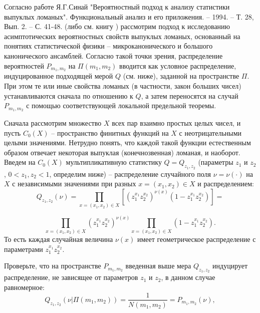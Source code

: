 \begin{ordre} 

Согласно работе Я.Г.Синай "Вероятностный подход к анализу статистики выпуклых ломаных". Функциональный анализ и его приложения. -- 1994. -- Т. 28, Вып. 2. -- С. 41-48. (либо см. книгу \cite{7}) рассмотрим подход к исследованию асимптотических вероятностных свойств выпуклых ломаных, основанный на понятиях статистической физики -- микроканонического и большого канонического ансамблей. Согласно такой точки зрения, распределение вероятностей $P_{m_{1} ,m_{2}}$ на $\Pi(m_{1} ,m_{2})$ вводится как условное распределение, индуцированное подходящей мерой $Q$ (см. ниже), заданной на
пространстве $\Pi$. При этом те или иные свойства ломаных (в частности, закон
больших чисел) устанавливаются сначала по отношению к $Q$, а затем переносятся
на случай $P_{m_{1} ,m_{2}}$  с помощью соответствующей локальной предельной теоремы.

Сначала рассмотрим множество $X$ всех пар взаимно простых целых чисел, и пусть $C_{0} (X)$ -- пространство финитных функций на $X$  с неотрицательными целыми значениями. Нетрудно понять, что каждой такой функции естественным образом отвечает некоторая выпуклая (конечнозвенная) ломаная, и наоборот. Введем на $C_{0} (X)$ мультипликативную статистику $Q = Q_{z_1,z_2}$ (параметры $z_1$ и $z_2$, $0<z_1,z_2<1$, определим ниже) -- распределение случайного поля $\nu = \nu(\cdot)$  на $X$ с независимыми значениями при разных $x = (x_1, x_2)\in X$  и распределением:
\[Q_{z_{1} ,z_{2} } (\nu )=\prod _{x=(x_{1} ,x_{2} )\in X}\left[\left(z_{1}^{x_{1} } z_{2}^{x_{2} } \right)^{\nu (x)} \left(1-z_{1}^{x_{1} } z_{2}^{x_{2} } \right)\right] =\] 

\[\prod _{x=(x_{1} ,x_{2} )\in X}\left(z_{1}^{x_{1} } z_{2}^{x_{2} } \right)^{\nu (x)}  \prod _{x=(x_{1} ,x_{2} )\in X}\left(1-z_{1}^{x_{1} } z_{2}^{x_{2} } \right) .\] 
То есть каждая случайная величина $\nu (x)$ имеет геометрическое распределение с параметрами $z_{1}^{x_{1} } z_{2}^{x_{2} } $.

Проверьте, что на пространстве $P_{m_{1} ,m_{2}}$ введенная выше мера $Q_{z_1,z_2}$ индуцирует распределение, не зависящее от параметров $z_1$ и $z_2$, в данном случае равномерное:
\[Q_{z_{1} ,z_{2} } \left(\nu |\Pi (m_{1} ,m_{2} )\right)=\frac{1}{N(m_{1} ,m_{2} )} =P_{m_{1} ,m_{2} } (\nu ),\]


\end{ordre}
